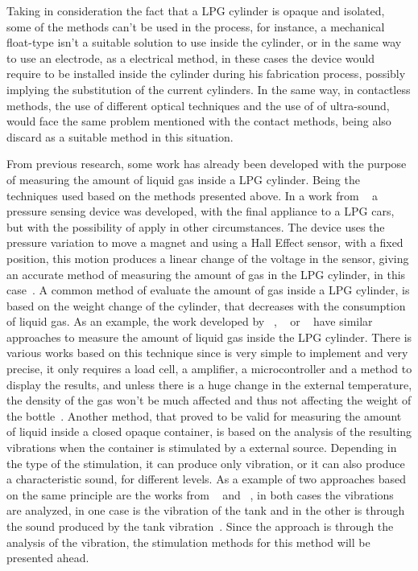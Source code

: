 Taking in consideration the fact that a LPG cylinder is opaque and isolated, some of the methods can't be used in the process, for instance, a mechanical float-type isn't a suitable solution to use inside the cylinder, or in the same way to use an electrode, as a electrical method, in these cases the device would require to be installed inside the cylinder during his fabrication process, possibly implying the substitution of the current cylinders. In the same way, in contactless methods, the use of different optical techniques and the use of of ultra-sound, would face the same problem mentioned with the contact methods, being also discard as a suitable method in this situation. 

From previous research, some work has already been developed with the purpose of measuring the amount of liquid gas inside a LPG cylinder. Being the techniques used based on the methods presented above.
In a work from ~\citeauthor{baigAccurateMeasurementPressure2008b} a pressure sensing device was developed, with the final appliance to a LPG cars, but with the possibility of apply in other circumstances. The device uses the pressure variation to move a magnet and using a Hall Effect sensor, with a fixed position, this motion produces a linear change of the voltage in the sensor, giving an accurate method of measuring the amount of gas in the LPG cylinder, in this case~\cite{baigAccurateMeasurementPressure2008b}. 
A common method of evaluate the amount of gas inside a LPG cylinder, is based on the weight change of the cylinder, that decreases with the consumption of liquid gas. As an example, the work developed by ~\citeauthor{dasilvamedeirosSmartgasSmartPlatform2017a}, ~\citeauthor{shresthaIoTBasedSmart2019a} or ~\citeauthor{shinganSmartGasCylinder2017a} have similar approaches to measure the amount of liquid gas inside the LPG cylinder. There is various works based on this technique since is very simple to implement and very precise, it only requires a load cell, a amplifier, a microcontroller and a method to display the results, and unless there is a huge change in the external temperature, the density of the gas won't be much affected and thus not affecting the weight of the bottle~\cite{dasilvamedeirosSmartgasSmartPlatform2017a,shresthaIoTBasedSmart2019a,shinganSmartGasCylinder2017a}.
Another method, that proved to be valid for measuring the amount of liquid inside a closed opaque container, is based on the analysis of the resulting vibrations when the container is stimulated by a external source. Depending in the type of the stimulation, it can produce only vibration, or it can also produce a characteristic sound, for different levels. As a example of two approaches based on the same principle are the works from ~\citeauthor{jahnLevelSensorFluids2014a} and ~\citeauthor{wuAnalysisImplementationNoncontact2016a}, in both cases the vibrations are analyzed, in one case is the vibration of the tank and in the other is through the sound produced by the tank vibration~\cite{jahnLevelSensorFluids2014a,wuAnalysisImplementationNoncontact2016a}. Since the approach is through the analysis of the vibration, the stimulation methods for this method will be presented ahead. 


